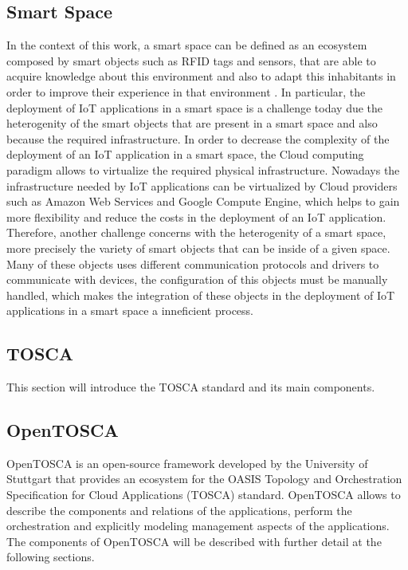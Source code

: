 \subsection{Smart Space}
\label{sub:Smart Space}
In the context of this work, a smart space can be defined as an ecosystem composed by smart objects such as RFID tags and sensors, that are able to
acquire knowledge about this environment and also to adapt this inhabitants in order to improve their experience in that environment \cite{cook2004smart}.
In particular, the deployment of IoT applications in a smart space is a challenge today due the heterogenity of the smart objects that are present in a smart space
and also because the required infrastructure. In order to decrease the complexity of the deployment of an IoT application in a smart space, the Cloud computing paradigm allows to
virtualize the required physical infrastructure. Nowadays the infrastructure needed by IoT applications can be virtualized by Cloud providers such as Amazon Web Services
and Google Compute Engine, which helps to gain more flexibility and reduce the costs in the deployment of an IoT application. Therefore, another challenge concerns with the heterogenity
of a smart space, more precisely the variety of smart objects that can be inside of a given space. Many of these objects uses different communication protocols and drivers to communicate with devices,
the configuration of this objects must be manually handled, which makes the integration of these objects in the deployment of IoT applications in a smart space a inneficient process.  
\subsection{TOSCA}
\label{sub:TOSCA}
This section will introduce the TOSCA standard and its main components.
\subsection{OpenTOSCA}
\label{sub:OpenTOSCA}
OpenTOSCA is an open-source framework developed by the University of Stuttgart that provides an ecosystem for the OASIS Topology and Orchestration Specification for
Cloud Applications (TOSCA) standard. OpenTOSCA allows to describe the components and relations of the applications, perform the orchestration and explicitly modeling
management aspects of the applications. The components of OpenTOSCA will be described with further detail at the following sections.
